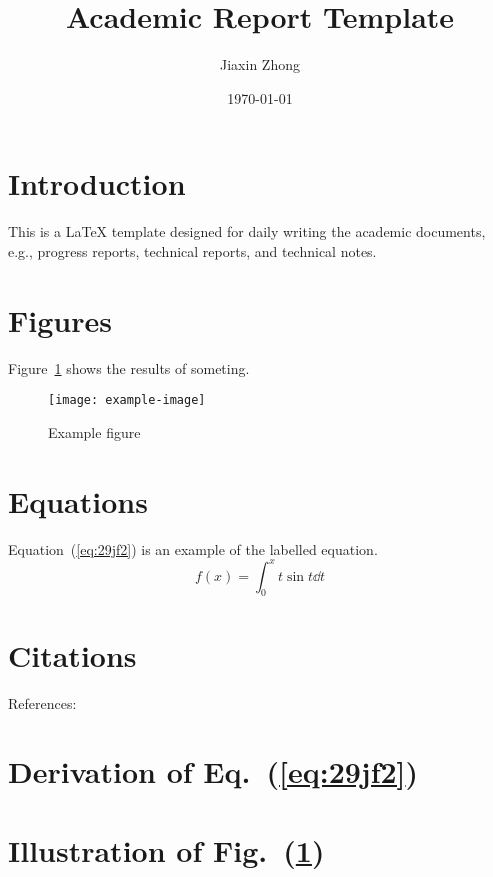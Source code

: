 \documentclass{article}
\title{\textbf{Academic Report Template}}
\author{Jiaxin Zhong}
\date{\today}
\begin{document}
\maketitle
\thispagestyle{firststyle}

\section{Introduction}
This is a \LaTeX{} template designed for daily writing the academic documents, e.g., progress reports, technical reports, and technical notes.

\lipsum[1]

\lipsum[2]

\lipsum[3]

\lipsum[4]

\lipsum[5]

\lipsum[6]

\section{Figures}
Figure~\ref{fig:39:f020390} shows the results of someting.
\begin{figure}[!htb]
    \centering
    \texttt{[image: example-image]}
    \caption{Example figure}
    \label{fig:39:f020390}
\end{figure}


\section{Equations}
Equation~(\ref{eq:29jf2}) is an example of the labelled equation.
\begin{equation}
    f(x) = \int_0^x t\sin t \dd t
    \label{eq:29jf2}
\end{equation}

\section{Citations}
References: \cite{Zhong2020InsertionLossThin}



\begin{appendices}

\section{Derivation of Eq.~(\ref{eq:29jf2})}
\lipsum[1]

\lipsum[1]

\lipsum[1]

\section{Illustration of Fig.~(\ref{fig:39:f020390})}
\lipsum[1]

\lipsum[1]
\end{appendices}




\end{document}
